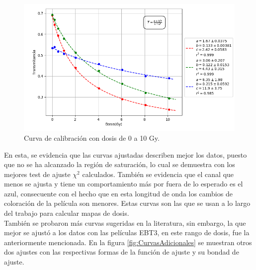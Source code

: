 \begin{figure}[H]
	\centering
	\includegraphics[width=\linewidth]{images/calibracionMulti_2.png}
	\caption{Curva de calibración con dosis de 0 a 10 Gy. }
	\label{fig:curvaFinal}
\end{figure}

En esta, se evidencia que las curvas ajustadas describen mejor los datos, puesto que no se ha alcanzado la región de saturación, lo cual se demuestra con los mejores test de ajuste $\chi ^2$ calculados. También se evidencia que el canal que menos se ajusta y tiene un comportamiento más por fuera de lo esperado es el azul, consecuente con el hecho que en esta longitud de onda los cambios de coloración de la película son menores. Estas curvas son las que se usan a lo largo del trabajo para calcular mapas de dosis.\\

También se probaron más curvas sugeridas en la literatura, sin embargo, la que mejor se ajustó a los datos con las películas EBT3, en este rango de dosis, fue la anteriormente mencionada. En la figura \ref{fig:CurvasAdicionales} se muestran otros dos ajustes con las respectivas formas de la función de ajuste y su bondad de ajuste.


